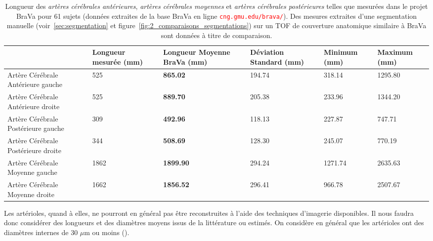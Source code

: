 \begin{table}
\caption{Longueur des {\em artères cérébrales antérieures}, {\em artères cérébrales moyennes} et {\em artères cérébrales postérieures} telles que mesurées dans le projet BraVa pour 61 sujets (données extraites de la base BraVa en ligne \textcolor{red}{\tt cng.gmu.edu/brava/}). Des mesures extraites d'une segmentation manuelle (voir~\ref{sec:segmentation} et figure~\ref{fig:2_comparaisons_segmentations}) sur un TOF de couverture anatomique similaire à BraVa sont données à titre de comparaison.}
\label{tab:databrava}
\begin{tabularx}{\linewidth}{|X| X X X X X|}
\hline
\centering
      & Longueur mesurée (mm) &  Longueur Moyenne BraVa (mm) &  Déviation Standard (mm) & Minimum (mm) & Maximum  (mm)\\
 \hline
   {\small Artère Cérébrale Antérieure gauche} & 525 &  {\bf 865.02}	&194.74	&318.14	&1295.80 \\
\hline
    {\small Artère Cérébrale Antérieure droite} & 525 & {\bf  889.70}	& 205.38	&233.96	&1344.20 \\
\hline
    {\small Artère Cérébrale Postérieure gauche} & 309 &  {\bf 492.96}	&118.13	&227.87	&747.71 \\
\hline
   {\small Artère Cérébrale Postérieure droite } & 344 & {\bf 508.69}	&128.30	&245.07	&770.19\\
\hline
   {\small Artère Cérébrale Moyenne gauche} &   1862	&{\bf  1899.90}	&294.24	&1271.74	&2635.63 \\
\hline
   {\small Artère Cérébrale Moyenne  droite} &  1662 &{\bf 1856.52}	&296.41	&966.78	&2507.67 \\
   
\hline

\end{tabularx}
\end{table}




Les artérioles, quand à elles, ne pourront en général pas être reconstruites à l'aide des techniques d'imagerie disponibles. Il nous faudra donc considérer des longueurs et des diamètres moyens issus de la littérature ou estimés. On considère en général que les artérioles ont des diamètres internes de 30 $\mu$m ou moins (\cite{Martini2009}).
